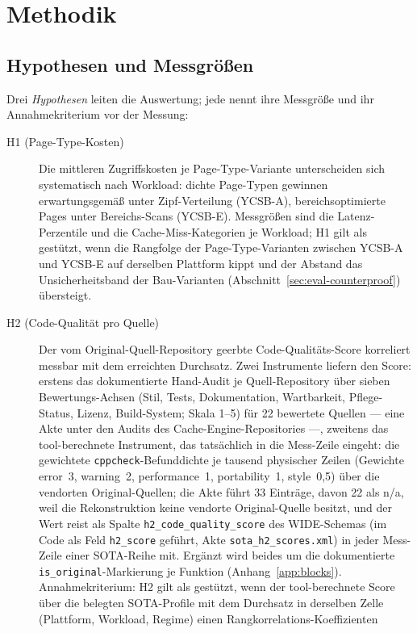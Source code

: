 \section{Methodik}\label{sec:eval-method}
\subsection{Hypothesen und Messgrößen}\label{sec:eval-hypotheses}
Drei \emph{Hypothesen} leiten die Auswertung; jede nennt ihre Messgröße und ihr Annahmekriterium vor
der Messung:
\begin{description}
  \item[H1 (Page-Type-Kosten)] Die mittleren Zugriffskosten je Page-Type-Variante unterscheiden sich
  systematisch nach Workload: dichte Page-Typen gewinnen erwartungsgemäß unter Zipf-Verteilung (YCSB-A),
  bereichsoptimierte Pages unter Bereichs-Scans (YCSB-E). Messgrößen sind die Latenz-Perzentile und die
  Cache-Miss-Kategorien je Workload; H1 gilt als gestützt, wenn die Rangfolge der Page-Type-Varianten
  zwischen YCSB-A und YCSB-E auf derselben Plattform kippt und der Abstand das Unsicherheitsband der
  Bau-Varianten (Abschnitt~\ref{sec:eval-counterproof}) übersteigt.
  \item[H2 (Code-Qualität pro Quelle)] Der vom Original-Quell-Repository geerbte Code-Qualitäts-Score
  korreliert messbar mit dem erreichten Durchsatz. Zwei Instrumente liefern den Score: erstens das
  dokumentierte Hand-Audit je Quell-Repository über sieben Bewertungs-Achsen (Stil, Tests,
  Dokumentation, Wartbarkeit, Pflege-Status, Lizenz, Build-System; Skala 1--5) für 22 bewertete
  Quellen --- eine Akte unter den Audits des Cache-Engine-Repositories ---, zweitens das
  tool-berechnete Instrument, das tatsächlich in die Mess-Zeile eingeht: die gewichtete
  \texttt{cppcheck}-Befunddichte je tausend physischer Zeilen (Gewichte error~3, warning~2,
  performance~1, portability~1, style~0,5) über die vendorten Original-Quellen; die Akte führt 33
  Einträge, davon 22 als n/a, weil die Rekonstruktion keine vendorte Original-Quelle besitzt, und der
  Wert reist als Spalte \texttt{h2\_code\_quality\_score} des WIDE-Schemas (im Code als Feld
  \texttt{h2\_score} geführt, Akte \texttt{sota\_h2\_scores.xml}) in jeder Mess-Zeile einer
  SOTA-Reihe mit. Ergänzt wird
  beides um die dokumentierte \texttt{is\_original}-Markierung je Funktion (Anhang~\ref{app:blocks}).
  Annahmekriterium: H2 gilt als gestützt, wenn der tool-berechnete Score über die belegten SOTA-Profile
  mit dem Durchsatz in derselben Zelle (Plattform, Workload, Regime) einen Rangkorrelations-Koeffizienten

\end{description}
